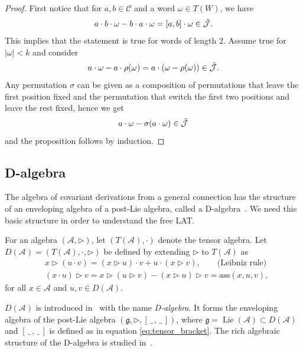 \documentclass[10pt,a4paper]{amsart}
\newcommand{\dpr}{\! \cdot \!}  %
\newcommand*{\Lie}{\operatorname{Lie}}
\newcommand{\noarg}{\,\_\,}
\numberwithin{equation}{section}
\begin{document}
\begin{proof}
 First notice that for $a,b \in \mathcal{C}$ and a word $\omega \in T(W)$, we have
 \[
 a\cdot b \cdot \omega - b \cdot a \cdot \omega = [a,b] \cdot \omega \in \Tilde{\mathcal{J}}.
 \]
 This implies that the statement is true for words of length $2$. Assume true for $|\omega| < k$ and consider
 \[
 a\cdot \omega - a \cdot \rho(\omega) = a \cdot (\omega - \rho(\omega) ) \in \Tilde{\mathcal{J}}.
 \]
 Any permutation $\sigma$ can be given as a composition of permutations that leave the first position fixed and the permutation that switch the first two positions and leave the rest fixed, hence we get
 \[
 a\cdot \omega - \sigma(a \cdot \omega) \in \Tilde{\mathcal{J}}
 \]
 and the proposition follows by induction.
\end{proof}

\subsection{D-algebra}%
The algebra of covariant derivations from a general connection has the structure of an enveloping algebra of a post-Lie algebra, called a D-algebra~\cite{MK_Wright_08}. We need this basic structure in order to understand the free LAT.

For an algebra $(\mathcal{A},\rhd)$, let $(T(\mathcal{A}),\cdot)$ denote the tensor algebra. Let $D(\mathcal{A}) = (T(\mathcal{A}),\cdot,\rhd)$ be defined by extending $\rhd$ to $T(\mathcal{A})$ as
\begin{align}
&x\rhd ({u\dpr v})= {(x\rhd u)\cdot v} + {u\dpr (x\rhd v)}, \qquad \mbox{(Leibniz rule)}\label{eq:DA1}\\
&({x\dpr u})\rhd v= x\rhd(u\rhd v) - (x\rhd u) \rhd v = \text{ass}(x,u,v), \label{eq:DA2}
\end{align}
for all $x\in \mathcal{A}$ and $u,v\in D(\mathcal{A})$. %

\begin{Note} $D(\mathcal{A})$ is introduced in~\cite{MK_Wright_08} with the name \emph{D-algebra}. It forms the enveloping algebra of
the post-Lie algebra $(\mathfrak{g},\rhd,[\noarg,\noarg])$, where $\mathfrak{g} = \Lie(\mathcal{A})\subset D(\mathcal{A})$ and $[ \noarg , \noarg]$ is defined as in equation \eqref{eq:tensor_bracket}. The rich algebraic structure of the D-algebra is studied in~\cite{KMKL_15,MK_Lundervold_2013,MK_Wright_08}.
\end{Note}
\end{document}
